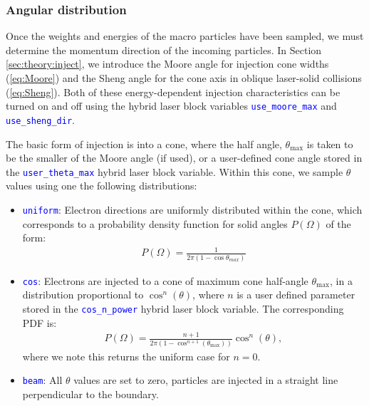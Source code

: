 \documentclass[12pt]{article}
\numberwithin{equation}{section}
\begin{document}
\subsubsection{Angular distribution} \label{sec:code:injector:angles}

Once the weights and energies of the macro particles have been sampled, we must determine the momentum direction of the incoming particles. In Section \ref{sec:theory:inject}, we introduce the Moore angle for injection cone widths (\ref{eq:Moore}) and the Sheng angle for the cone axis in oblique laser-solid collisions (\ref{eq:Sheng}). Both of these energy-dependent injection characteristics can be turned on and off using the hybrid laser block variables \textcolor{blue}{\texttt{use\_moore\_max}} and \textcolor{blue}{\texttt{use\_sheng\_dir}}.

The basic form of injection is into a cone, where the half angle, $\theta_{\text{max}}$ is taken to be the smaller of the Moore angle (if used), or a user-defined cone angle stored in the \textcolor{blue}{\texttt{user\_theta\_max}} hybrid laser block variable. Within this cone, we sample $\theta$ values using one the following distributions:

\begin{itemize}
  \item \textcolor{blue}{\texttt{uniform}}: Electron directions are uniformly distributed within the cone, which corresponds to a probability density function for solid angles $P(\Omega)$ of the form:
  \begin{align}
    P(\Omega) = \frac{1}{2\pi(1-\cos\theta_{max})}
  \end{align} 
% 
  \item \textcolor{blue}{\texttt{cos}}: Electrons are injected to a cone of maximum cone half-angle $\theta_{\text{max}}$, in a distribution proportional to $\cos^n(\theta)$, where $n$ is a user defined parameter stored in the \textcolor{blue}{\texttt{cos\_n\_power}} hybrid laser block variable. The corresponding PDF is:
   \begin{align}
    P(\Omega) = \frac{n+1}{2\pi\left(1 - \cos^{n+1}(\theta_\text{max})\right)}\cos^{n}(\theta),
  \end{align}
where we note this returns the uniform case for $n=0$.
% 
  \item \textcolor{blue}{\texttt{beam}}: All $\theta$ values are set to zero, particles are injected in a straight line perpendicular to the boundary.
\end{itemize}
\end{document}
